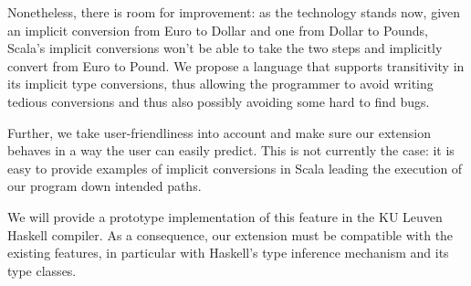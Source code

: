 Nonetheless, there is room for improvement: as the technology stands now, given an implicit conversion from Euro to Dollar and one from Dollar to Pounds, Scala's implicit conversions won't be able to take the two steps and implicitly convert from Euro to Pound. We propose a language that supports transitivity in its implicit type conversions, thus allowing the programmer to avoid writing tedious conversions and thus also possibly avoiding some hard to find bugs.

Further, we take user-friendliness into account and make sure our extension behaves in a way the user can easily predict. This is not currently the case: it is easy to provide examples of implicit conversions in Scala leading the execution of our program down intended paths.

We will provide a prototype implementation of this feature in the KU Leuven Haskell compiler. As a consequence, our extension must be compatible with the existing features, in particular with Haskell's type inference mechanism and its type classes.

